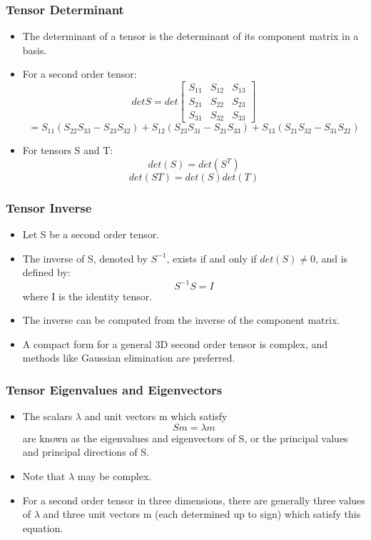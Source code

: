 \documentclass[aspectratio=169,11pt]{beamer}
\begin{document}
\begin{frame}
\frametitle{Tensor Determinant}
\begin{itemize}
    \item The determinant of a tensor is the determinant of its component matrix in a basis. 
    \item For a second order tensor: 
    \[
    det S = det
    \begin{bmatrix}
        S_{11} & S_{12} & S_{13} \\
        S_{21} & S_{22} & S_{23} \\
        S_{31} & S_{32} & S_{33}
    \end{bmatrix}
    \]
    \small
    \[
    = S_{11}(S_{22}S_{33} - S_{23}S_{32}) + S_{12}(S_{23}S_{31} - S_{21}S_{33}) + S_{13}(S_{21}S_{32} - S_{31}S_{22})
    \]

    \item For tensors S and T: 
    \[
    det(S) = det(S^T)
    \]
    \[
    det(S T) = det(S)det(T)
    \]
\end{itemize}
\end{frame}

\begin{frame}
\frametitle{Tensor Inverse}
\begin{itemize}
    \item Let S be a second order tensor. 
    \item The inverse of S, denoted by \(S^{-1}\), exists if and only if \(det(S) \neq 0\), and is defined by: 
    \[
    S^{-1} S = I
    \]
    where I is the identity tensor.
    \item The inverse can be computed from the inverse of the component matrix. 
    \item A compact form for a general 3D second order tensor is complex, and methods like Gaussian elimination are preferred. 
\end{itemize}
\end{frame}

\begin{frame}
\frametitle{Tensor Eigenvalues and Eigenvectors}
\begin{itemize}
    \item The scalars \(\lambda\) and unit vectors m which satisfy
    \[
    S m = \lambda m
    \]
    are known as the eigenvalues and eigenvectors of S, or the principal values and principal directions of S.
    \item Note that \(\lambda\) may be complex.
    \item For a second order tensor in three dimensions, there are generally three values of \(\lambda\) and three unit vectors m (each determined up to sign) which satisfy this equation.
\end{itemize}
\end{frame}
\end{document}
